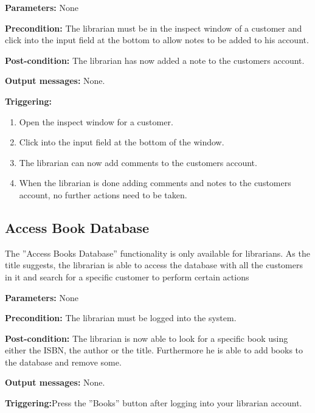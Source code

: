 \begin{description}

\item \textbf{Parameters:} None

\item \textbf{Precondition:} The librarian must be in the inspect window of a
customer and click into the input field at the bottom to allow notes to be added
to his account.

\item \textbf{Post-condition:} The librarian has now added a note to the
customers account.

\item \textbf{Output messages:} None.

\item \textbf{Triggering:}
\begin{enumerate}
\item Open the inspect window for a customer.
\item Click into the input field at the bottom of the window.
\item The librarian can now add comments to the customers account.
\item When the librarian is done adding comments and notes to the customers
account, no further actions need to be taken.
\end{enumerate}

\end{description}

\subsection{Access Book Database}

The ''Access Books Database'' functionality is only available for
librarians. As the title suggests, the librarian is able to access the database
with all the customers in it and search for a specific customer to perform
certain actions

\begin{description}

\item \textbf{Parameters:} None

\item \textbf{Precondition:} The librarian must be logged into the system.

\item \textbf{Post-condition:} The librarian is now able to look for a specific
book using either the ISBN, the author or the title. Furthermore he is able to
add books to the database and remove some.

\item \textbf{Output messages:} None.

\item \textbf{Triggering:}Press the ''Books'' button after logging into
your librarian account.

\end{description}

